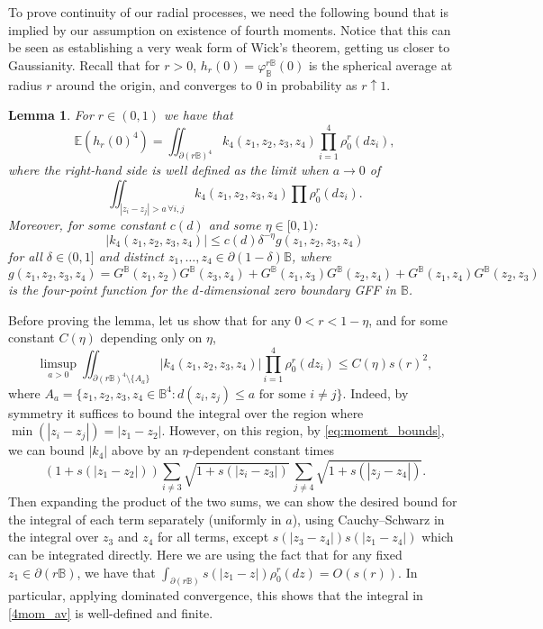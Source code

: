 \documentclass[JEP,XML,SOM,Unicode,published]{cedram}
\newtheorem{lemma}[theorem]{Lemma}
\theoremstyle{definition}
\newcommand{\E}{\mathbb{E}}
\newcommand{\B}{\mathbb{B}}\let\D\B\let\Ub\B
\begin{document}
To prove continuity of our radial processes, we need the following bound that is implied by our assumption on existence of fourth moments. Notice that this can be seen as establishing a very weak form of Wick's theorem, \ie getting us closer to Gaussianity. Recall that for $r>0$, $h_r(0)=\varphi_\B^{r \B}(0)$ is the spherical average at radius $r$ around the origin, and converges to $0$ in probability as $r\uparrow 1$.
\begin{lemma}\label{lem:4mtbnd}
For $r\in (0,1)$ we have that
\begin{equation}\label{4mom_av}
\E(h_r(0)^4)=\iint_{\partial(r\B)^4} k_4(z_1,z_2,z_3,z_4) \prod_{i=1}^4 \rho_0^r(dz_i),
\end{equation}
where the right-hand side is well defined as the limit when $a\to 0$ of
\[
\iint_{|z_i-z_j|>a \, \forall i,j} k_4(z_1,z_2,z_3,z_4) \prod \rho_0^r(dz_i).
\]
Moreover, for some constant $c(d)$ and some $\eta\in[0,1)$:
\begin{equation}\label{K4bound} |k_4(z_1,z_2,z_3,z_4)|\le c(d) \delta^{-\eta} g(z_1,z_2,z_3,z_4)\end{equation} for all $\delta\in (0,1]$ and distinct $z_1,\dots, z_4 \in \partial (1-\delta)\B$, where
\[
g(z_1,z_2,z_3,z_4)= G^\B(z_1,z_2)G^\B(z_3,z_4)+G^\B(z_1,z_3)G^\B(z_2,z_4)+G^\B(z_1,z_4)G^\B(z_2,z_3)
\]
{is the four-point function for the $d$-dimensional zero boundary GFF in $\B$.}
\end{lemma}

Before proving the lemma, let us show that for any {$0<r<1-\eta$}, and for some constant $C(\eta)$ depending only on $\eta$,
\begin{equation}\label{eq:k4sphere_crude}
\limsup_{a>0}\iint_{\partial(r\B)^4\setminus\{A_a\}} |k_4(z_1,z_2,z_3,z_4)| \prod_{i=1}^4 \rho_0^r(dz_i) \le C(\eta) s(r)^2,
\end{equation}
where $A_a=\{z_1,z_2,z_3,z_4\in \B^4: d(z_i,z_j)\le a \text{ for some } i\ne j\}$.
Indeed, by symmetry it suffices to bound the integral over the region where $\min(|z_i-z_j|)=|z_1-z_2|$. However, on this region, by \eqref{eq:moment_bounds}, we can bound $|k_4|$ above by an $\eta$-dependent constant times
\[
(1+s(|z_1-z_2|))\sum_{i\ne 3} \sqrt{1+s(|z_i-z_3|)}\, \sum_{j\ne 4} \sqrt{1+s(|z_j-z_4|)}.
\]
Then expanding the product of the two sums, we can show the desired bound for the integral of each term separately (uniformly in $a$), using Cauchy--Schwarz in the integral over $z_3$ and $z_4$ for all terms, except $s(|z_3-z_4|)s(|z_1-z_4|)$ which can be integrated directly. Here we are using the fact that for any fixed $z_1\in \partial (r\B)$, we have that $\int_{\partial (r\B)} s(|z_1-z|){\rho_0^r(dz)}=O(s(r))$.
In particular, applying dominated convergence, this shows that the integral in \eqref{4mom_av} is well-defined and finite.
\end{document}
